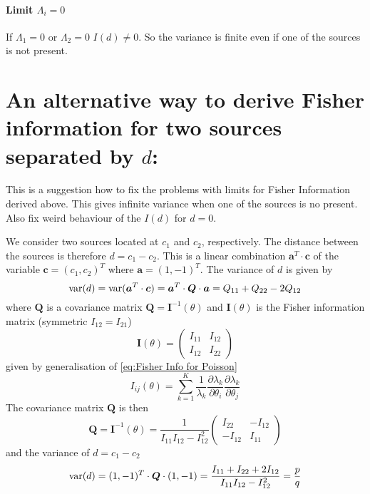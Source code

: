 \paragraph*{Limit $\Lambda_i=0$}
If $\Lambda_1=0$ or $\Lambda_2=0$ $I(d)\neq0$. So the variance is finite even if one of the sources is not present.


\section{An alternative way to derive Fisher information for two sources separated by $d$:}
\label{sec:Appendix FI alternative}
This is a suggestion how to fix the problems with limits for Fisher Information derived above. This gives infinite variance when one of the sources is no present. Also fix weird behaviour of the $I(d)$ for $d=0$. 

We consider two sources located at $c_1$ and $c_2$, respectively. The distance between the sources is therefore $d=c_1-c_2$. This is a linear combination $\bm{a}^T\cdot\bm{c}$ of the variable $\bm{c}=(c_1,c_2)^T$ where $\bm{a}=(1,-1)^T$. The variance of $d$ is given by 
%
\begin{equation}
	\mathrm{var}(d)=\mathrm{var}(\bm{a}^T\cdot\bm{c})=\bm{a}^T\cdot\bm{Q}\cdot\bm{a}=Q_{11}+Q_{22}-2Q_{12}
\end{equation}
%
where $\bm{Q}$ is a covariance matrix $\bm{Q}=\bm{I}^{-1}(\theta)$ and $\bm{I}(\theta)$ is the Fisher information matrix (symmetric
$I_{12}=I_{21}$)
%
\begin{equation}
	\bm{I}(\theta)=\left(
	\begin{array}{cc}
		I_{11} & I_{12}\\
		I_{12} & I_{22}
	\end{array}\right)
\end{equation}
%
given by generalisation of \autoref{eq:Fisher Info for Poisson}
%
\begin{equation}
	I_{ij}(\theta)=\sum_{k=1}^K\frac{1}{\lambda_k}\frac{\partial\lambda_k}{\partial\theta_i}\frac{\partial\lambda_k}{\partial\theta_j}
	\label{eq:Fisher Info gerneral lambda}
\end{equation}
%
The covariance matrix $\bm{Q}$ is then 
%
\begin{equation}
	\bm{Q}=\bm{I}^{-1}(\theta)=\frac{1}{I_{11}I_{12}-I_{12}^2}\left(
	\begin{array}{cc}
		I_{22} & -I_{12}\\
		-I_{12} & I_{11}
	\end{array}\right)
\end{equation}
%
and the variance of $d=c_1-c_2$ 
%
\begin{equation}
	\mathrm{var}(d)=(1,-1)^T\cdot\bm{Q}\cdot(1,-1)=\frac{I_{11}+I_{22}+2I_{12}}{I_{11}I_{12}-I_{12}^2}=\frac{p}{q}
	\label{eq:variance alternative}
\end{equation}

